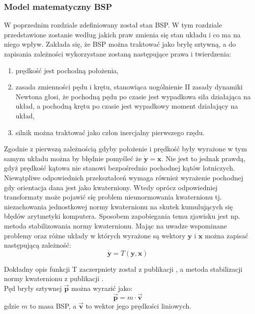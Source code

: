 \subsubsection{Model matematyczny BSP}

W poprzednim rozdziale zdefiniowany został stan BSP. W tym rozdziale przedstawione zostanie według jakich praw zmienia się stan układu i co ma na niego wpływ. Zakłada się, że BSP można traktować jako bryłę sztywną, a do zapisania zależności wykorzystane zostaną następujące prawa i twierdzenia:

\begin{enumerate}
\item prędkość jest pochodną położenia,
\item zasada zmienności pędu i krętu, stanowiąca uogólnienie II zasady dynamiki Newtona głosi, że pochodną pędu po czasie jest wypadkowa siła działająca na układ, a pochodną krętu po czasie jest wypadkowy moment działający na układ,
\item silnik można traktować jako człon inercjalny pierwszego rzędu.
\end{enumerate}

Zgodnie z pierwszą zależnością gdyby położenie i prędkość były wyrażone w tym samym układu można by błędnie pomyśleć że $\bm{\dot{y}} = \bm{x}$. Nie jest to jednak prawdą, gdyż prędkość kątowa nie stanowi bezpośrednio pochodnej kątów lotniczych. Niewątpliwe odpowiednich przekształceń wymaga również wyrażenie pochodnej gdy orientacja dana jest jako kwaterniony. Wtedy oprócz odpowiedniej transformaty może pojawić się problem nieunormowania kwaternionu tj. niezachowania jednostkowej normy kwaternionu na skutek kumulujących się błędów arytmetyki komputera. Sposobem zapobiegania temu zjawisku jest np. metoda stabilizowania normy kwaternionu. Mając na uwadze wspominane problemy oraz różne układy w których wyrażone są wektory $\bm{y}$ i $\bm{x}$ można zapisać następującą zależność:
\[
	\bm{\dot{y}} = T(\bm{y}, \bm{x})
\]

Dokładny opis funkcji T zaczerpniety został z publikacji \cite{energies}, a metoda stabilizacji normy kwaternionu z publikacji \cite{quaterion}.\\ %

Pęd bryły sztywnej $\bm{\vec{p}}$ można wyrazić jako:
\[
	\bm{\vec{p}} = m \cdot \bm{\vec{v}}
\]
gdzie $m$ to masa BSP, a $\bm{\vec{v}}$ to wektor jego prędkości liniowych.

